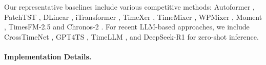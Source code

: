 Our representative baselines include various competitive methods:
Autoformer \citep{wu2021autoformer}, PatchTST \citep{nie2022time}, DLinear \citep{zeng2023transformers}, iTransformer \citep{liu2023itransformer}, TimeXer \citep{wang2024timexer}, TimeMixer \citep{wang2024timemixer}, 
WPMixer \citep{murad2025wpmixer}, Moment \citep{goswami2024moment}, TimesFM-2.5 \citep{das2024decoder} and Chronos-2 \citep{ansari2025chronos}. For recent LLM-based approaches, we include CrossTimeNet \citep{crossTimeNet}, GPT4TS \citep{zhou2023one}, TimeLLM \citep{jin2023time}, and DeepSeek-R1 \citep{deepseekR1} for zero-shot inference.



\paragraph{Implementation Details.}


